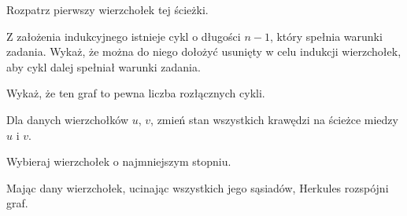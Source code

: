 
\begin{hints_list}
	\item Rozpatrz pierwszy wierzchołek tej ścieżki.
	\item Z założenia indukcyjnego istnieje cykl o długości $n - 1$, który spełnia warunki zadania. Wykaż, że można do niego dołożyć usunięty w celu indukcji wierzchołek, aby cykl dalej spełniał warunki zadania.
	\item Wykaż, że ten graf to pewna liczba rozłącznych cykli.
	\item Dla danych wierzchołków $u$, $v$, zmień stan wszystkich krawędzi na ścieżce miedzy $u$ i $v$.
	\item Wybieraj wierzchołek o najmniejszym stopniu.
	\item Mając dany wierzchołek, ucinając wszystkich jego sąsiadów, Herkules rozspójni graf.
\end{hints_list}